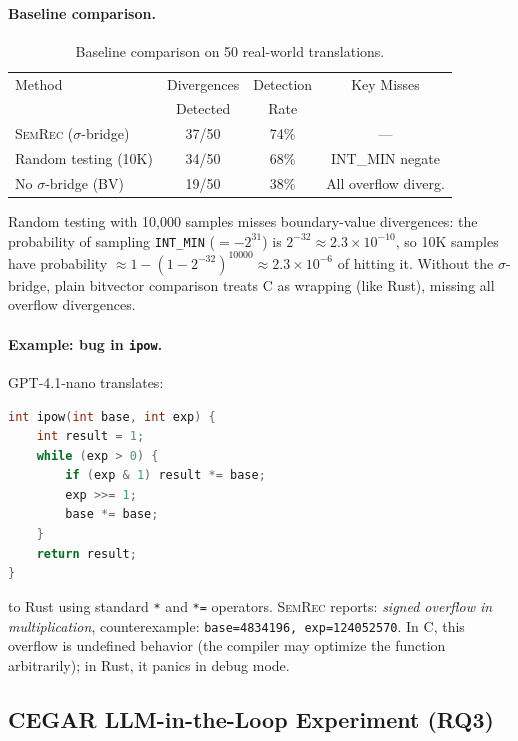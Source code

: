 \documentclass[11pt,a4paper]{article}
\begin{document}
\paragraph{Baseline comparison.}

\begin{table}[t]
\centering
\small
\caption{Baseline comparison on 50 real-world translations.}
\label{tab:baseline}
\begin{tabular}{@{}lccc@{}}
\toprule
Method & Divergences & Detection & Key Misses \\
 & Detected & Rate & \\
\midrule
\textsc{SemRec} ($\sigma$-bridge) & 37/50 & 74\% & --- \\
Random testing (10K) & 34/50 & 68\% & INT\_MIN negate \\
No $\sigma$-bridge (BV) & 19/50 & 38\% & All overflow diverg. \\
\bottomrule
\end{tabular}
\end{table}

Random testing with 10,000 samples misses boundary-value divergences:
the probability of sampling \texttt{INT\_MIN} ($= -2^{31}$) is
$2^{-32} \approx 2.3 \times 10^{-10}$, so 10K samples have probability
$\approx 1 - (1 - 2^{-32})^{10000} \approx 2.3 \times 10^{-6}$ of
hitting it.  Without the $\sigma$-bridge, plain bitvector comparison
treats C as wrapping (like Rust), missing all overflow divergences.

\paragraph{Example: bug in \texttt{ipow}.}
GPT-4.1-nano translates:
\begin{lstlisting}[language=C]
int ipow(int base, int exp) {
    int result = 1;
    while (exp > 0) {
        if (exp & 1) result *= base;
        exp >>= 1;
        base *= base;
    }
    return result;
}
\end{lstlisting}
to Rust using standard \texttt{*} and \texttt{*=} operators.
\textsc{SemRec} reports: \emph{signed overflow in multiplication},
counterexample: \texttt{base=4834196, exp=124052570}.  In C,
this overflow is undefined behavior (the compiler may optimize the
function arbitrarily); in Rust, it panics in debug mode.

\subsection{CEGAR LLM-in-the-Loop Experiment (RQ3)}\label{sec:eval-cegar}
\end{document}
